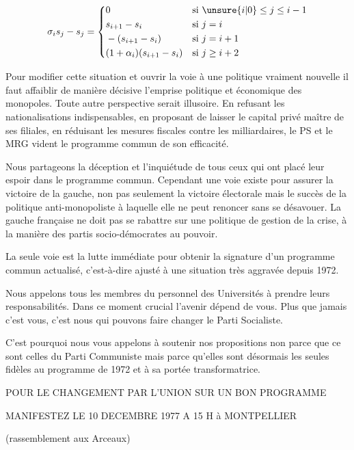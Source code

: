 \[
\sigma_is_j-s_j=\left\{\begin{aligned}
&0&&\text{si }\unsure{i|0}\leq j\leq i-1\\
&s_{i+1}-s_i&&\text{si }j=i\\
&-(s_{i+1}-s_i)&&\text{si }j=i+1\\
&(1+\alpha_i)(s_{i+1}-s_i)&&\text{si }j\geq i+2
\end{aligned}\right.
\]

Pour modifier cette situation et ouvrir la voie à une politique vraiment nouvelle il faut affaiblir de manière décisive l'emprise politique et économique des monopoles. Toute autre perspective serait illusoire. En refusant les nationalisations indispensables, en proposant de laisser le capital privé maître de ses filiales, en réduisant les mesures fiscales contre les milliardaires, le PS et le MRG vident le programme commun de son efficacité.

Nous partageons la déception et l'inquiétude de tous ceux qui ont placé leur espoir dans le programme commun. Cependant une voie existe pour assurer la victoire de la gauche, non pas seulement la victoire électorale mais le succès de la politique anti-monopoliste à laquelle elle ne peut renoncer sans se désavouer. La gauche française ne doit pas se rabattre sur une politique de gestion de la crise, à la manière des partis socio-démocrates au pouvoir.

La seule voie est la lutte immédiate pour obtenir la signature d'un programme commun actualisé, c'est-à-dire ajusté à une situation très aggravée depuis 1972.

Nous appelons tous les membres du personnel des Universités à prendre leurs responsabilités. Dans ce moment crucial l'avenir dépend de vous. Plus que jamais c'est vous, c'est nous qui pouvons faire changer le Parti Socialiste.

C'est pourquoi nous vous appelons à soutenir nos propositions non parce que ce sont celles du Parti Communiste mais parce qu'elles sont désormais les seules fidèles au programme de 1972 et à sa portée transformatrice.

\begin{center}
POUR LE CHANGEMENT PAR L'UNION SUR UN BON PROGRAMME
\end{center}

\begin{center}
MANIFESTEZ LE 10 DECEMBRE 1977 A 15 H à MONTPELLIER
\end{center}
\begin{flushright}
(rassemblement aux Arceaux)
\end{flushright}

